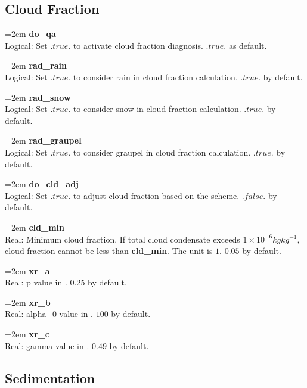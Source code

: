 \documentclass[letterpaper,titlepage,10pt]{article}
\numberwithin{equation}{section}
\begin{document}
\begin{appendices}

\subsection{Cloud Fraction}

\hangindent=2em
\textbf{do\_qa}\\ Logical: Set $.true.$ to activate cloud fraction diagnosis. $.true.$ as default.

\hangindent=2em
\textbf{rad\_rain}\\ Logical: Set $.true.$ to consider rain in cloud fraction calculation. $.true.$ by default.

\hangindent=2em
\textbf{rad\_snow}\\ Logical: Set $.true.$ to consider snow in cloud fraction calculation. $.true.$ by default.

\hangindent=2em
\textbf{rad\_graupel}\\ Logical: Set $.true.$ to consider graupel in cloud fraction calculation. $.true.$ by default.

\hangindent=2em
\textbf{do\_cld\_adj}\\ Logical: Set $.true.$ to adjust cloud fraction based on the \citet{xu1996asem} scheme. $.false.$ by default.

\hangindent=2em
\textbf{cld\_min}\\ Real: Minimum cloud fraction. If total cloud condensate exceeds $1 \times 10^{-6} kg kg^{-1}$, cloud fraction cannot be less than \textbf{cld\_min}. The unit is $1$. $0.05$ by default.

\hangindent=2em
\textbf{xr\_a}\\ Real: p value in \citet{xu1996asem}. $0.25$ by default.

\hangindent=2em
\textbf{xr\_b}\\ Real: alpha\_0 value in \citet{xu1996asem}. $100$ by default.

\hangindent=2em
\textbf{xr\_c}\\ Real: gamma value in \citet{xu1996asem}. $0.49$ by default.


\subsection{Sedimentation}


\end{appendices}
\end{document}
